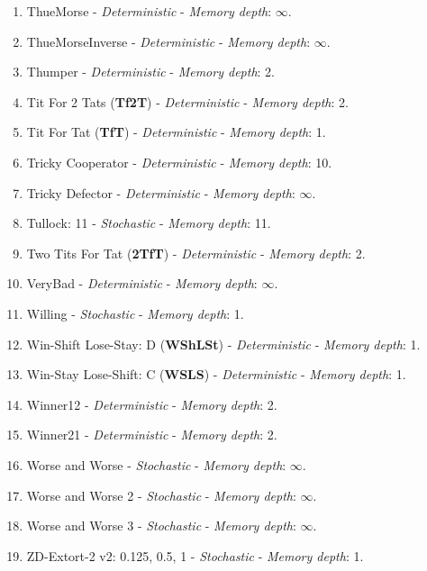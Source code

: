 \documentclass[10pt,letterpaper]{article}
\begin{document}
\begin{enumerate}
\item ThueMorse - \textit{Deterministic} - \textit{Memory depth}: \(\infty\). \cite{axelrodproject}
\item ThueMorseInverse - \textit{Deterministic} - \textit{Memory depth}: \(\infty\). \cite{axelrodproject}
\item Thumper - \textit{Deterministic} - \textit{Memory depth}: 2. \cite{Ashlock2008}
\item Tit For 2 Tats (\textbf{Tf2T}) - \textit{Deterministic} - \textit{Memory depth}: 2. \cite{Axelrod1984}
\item Tit For Tat (\textbf{TfT}) - \textit{Deterministic} - \textit{Memory depth}: 1. \cite{Axelrod1980}
\item Tricky Cooperator - \textit{Deterministic} - \textit{Memory depth}: 10. \cite{axelrodproject}
\item Tricky Defector - \textit{Deterministic} - \textit{Memory depth}: \(\infty\). \cite{axelrodproject}
\item Tullock: 11 - \textit{Stochastic} - \textit{Memory depth}: 11. \cite{Axelrod1980}
\item Two Tits For Tat (\textbf{2TfT}) - \textit{Deterministic} - \textit{Memory depth}: 2. \cite{Axelrod1984}
\item VeryBad - \textit{Deterministic} - \textit{Memory depth}: \(\infty\). \cite{Andre2013}
\item Willing - \textit{Stochastic} - \textit{Memory depth}: 1. \cite{Berg2015}
\item Win-Shift Lose-Stay: D (\textbf{WShLSt}) - \textit{Deterministic} - \textit{Memory depth}: 1. \cite{Li2011}
\item Win-Stay Lose-Shift: C (\textbf{WSLS}) - \textit{Deterministic} - \textit{Memory depth}: 1. \cite{Kraines1989, Nowak1993, Stewart2012}
\item Winner12 - \textit{Deterministic} - \textit{Memory depth}: 2. \cite{Mathieu2015}
\item Winner21 - \textit{Deterministic} - \textit{Memory depth}: 2. \cite{Mathieu2015}
\item Worse and Worse - \textit{Stochastic} - \textit{Memory depth}: \(\infty\). \cite{Prison1998}
\item Worse and Worse 2 - \textit{Stochastic} - \textit{Memory depth}: \(\infty\). \cite{Prison1998}
\item Worse and Worse 3 - \textit{Stochastic} - \textit{Memory depth}: \(\infty\). \cite{Prison1998}
\item ZD-Extort-2 v2: 0.125, 0.5, 1 - \textit{Stochastic} - \textit{Memory depth}: 1. \cite{Kuhn2017}

\end{enumerate}
\end{document}
